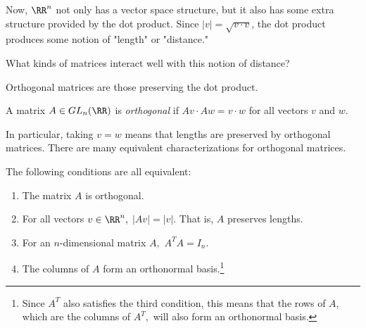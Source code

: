 Now, $\RR^n$ not only has a vector space structure, but it also has some extra structure provided by the dot product. Since $|v| = \sqrt{v \cdot v}$, the dot product produces some notion of "length" or "distance." 

\begin{qq}
What kinds of matrices interact well with this notion of distance?
\end{qq}

Orthogonal matrices are those preserving the dot product.
\begin{definition}
    A matrix $A \in GL_n(\RR)$ is \emph{orthogonal} if $Av \cdot A w = v \cdot w$ for all vectors $v$ and $w.$
\end{definition}

In particular, taking $v = w$ means that lengths are preserved by orthogonal matrices. There are many equivalent characterizations for orthogonal matrices.
\begin{theorem}
    The following conditions are all equivalent:
    \begin{enumerate}
        \item The matrix $A$ is orthogonal.
        \item For all vectors $v \in \RR^n,$ $|Av| = |v|$. That is, $A$ preserves lengths.
        \item For an $n$-dimensional matrix $A,$ $A^T A = I_n$.
        \item The columns of $A$ form an orthonormal basis.\footnote{Since $A^T$ also satisfies the third condition, this means that the rows of $A$, which are the columns of $A^T,$ will also form an orthonormal basis.}
    \end{enumerate}
\end{theorem}
